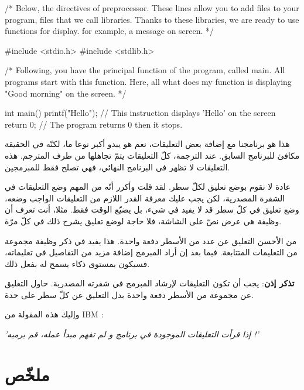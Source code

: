 \begin{Csource}
/*
Below, the directives of preprocessor.
These lines allow you to add files to your program,
files that we call libraries. Thanks to these libraries, we are ready to use functions for display.
for example, a message on screen.
*/

#include <stdio.h>
#include <stdlib.h>

/*
Following, you have the principal function of the program, called main.
All programs start with this function.
Here, all what does my function is displaying "Good morning" on the screen.
*/

int main()
{
  printf("Hello"); // This instruction displays 'Hello' on the screen
  return 0;          // The program returns 0 then it stops.
}
\end{Csource}

هذا هو برنامجنا مع إضافة بعض التعليقات، نعم هو يبدو أكبر نوعا ما، لكنّه في الحقيقة مكافئ للبرنامج السابق. عند الترجمة، كلّ التعليقات يتمّ تجاهلها من طرف المترجم. هذه التعليقات لا تظهر في البرنامج النهائي، فهي تصلح فقط للمبرمجين.

عادة لا نقوم بوضع تعليق لكلّ سطر. لقد قلت وأكرر أنّه من المهم وضع التعليقات في الشفرة المصدرية، لكن يجب عليك معرفة القدر اللازم من التعليقات الواجب وضعه، وضع تعليق في كلّ سطر قد لا يفيد في شيء، بل يضيّع الوقت فقط. مثلا، أنت تعرف أن وظيفة
هي عرض نصّ على الشاشة، فلا حاجة لوضع تعليق يشرح ذلك في كلّ مرّة.

من الأحسن التعليق عن عدد من الأسطر دفعة واحدة. هذا يفيد في ذكر وظيفة مجموعة من التعليمات المتتابعة. فيما بعد إن أراد المبرمج إضافة مزيد من التفاصيل في تعليماته، فسيكون بمستوى ذكاء يسمح له بفعل ذلك.

\textbf{تذكر إذن}:
يجب أن تكون التعليقات لإرشاد المبرمج في شفرته المصدرية. حاول التعليق عن مجموعة من الأسطر دفعة واحدة بدل التعليق عن كلّ سطر على حدة.

وإليك هذه المقولة من
\textenglish{IBM} :

\begin{center}
  \itshape\Large
  'إذا قرأت التعليقات الموجودة في برنامج و لم تفهم مبدأ عمله، قم برميه !'
\end{center}

\section*{ملخّص}

